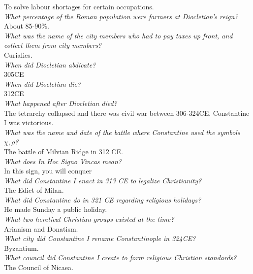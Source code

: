 \documentclass[12pt]{article}
\begin{document}
To solve labour shortages for certain occupations.\\

\textit{What percentage of the Roman population were farmers at Diocletian's reign?}\\
About 85-90\%.\\

\textit{What was the name of the city members who had to pay taxes up front, and collect them from city members?}\\
Curialies.\\

\textit{When did Diocletian abdicate?}\\
305CE\\

\textit{When did Diocletian die?}\\
312CE\\

\textit{What happened after Diocletian died?}\\

The tetrarchy collapsed and there was civil war between 306-324CE. Constantine I was victorious.\\

\textit{What was the name and date of the battle where Constantine used the symbols $\chi, \rho$?}\\
The battle of Milvian Ridge in 312 CE.\\

\textit{What does In Hoc Signo Vincas mean?}\\
In this sign, you will conquer\\

\textit{What did Constantine I enact in 313 CE to legalize Christianity?}\\
The Edict of Milan.\\

\textit{What did Constantine do in 321 CE regarding religious holidays?}\\
He made Sunday a public holiday.\\

\textit{What two heretical Christian groups existed at the time?}\\
Arianism and Donatism.\\

\textit{What city did Constantine I rename Constantinople in 324CE?}\\
Byzantium.\\

\textit{What council did Constantine I create to form religious Christian standards?}\\
The Council of Nicaea. \\
\end{document}
